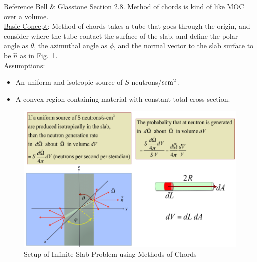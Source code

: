 \documentclass{school-22.211-notes}
\begin{document}
\clearpage
{} %
Reference Bell \& Glasstone Section 2.8. Method of chords is kind of like MOC over a volume. \\
\uline{Basic Concept}: Method of chords takes a tube that goes through the origin, and consider where the tube contact the surface of the slab, and define the polar angle as $\theta$, the azimuthal angle as $\phi$, and the normal vector to the slab surface to be $\hat{n}$ as in Fig.~\ref{inf-plane-1}. \\
\uline{Assumptions}:
\begin{itemize}
\item An uniform and isotropic source of $S$ neutrons/$\mathrm{s}\mathrm{cm}^2$. 
\item A convex region containing material with constant total cross section. 
\end{itemize}
\begin{figure}[h]
  \centering
  \includegraphics[width=6in]{images/pin/inf-plane-1.png}
  \caption{Setup of Infinite Slab Problem using Methods of Chords} \label{inf-plane-1}
\end{figure}
\end{document}
